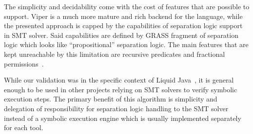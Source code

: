 \documentclass[sigplan,screen,review]{acmart}
\begin{document}
The simplicity and decidability come with the cost of features that are possible to support. Viper is a much more mature and rich backend for the language, while the presented approach is capped by the capabilities of separation logic support in SMT solver. Said capabilities are defined by GRASS fragment of separation logic which looks like ``propositional'' separation logic. The main features that are kept unreachable by this limitation are recursive predicates and fractional permissions~\cite{DBLP:conf/sas/Boyland03}. 

While our validation was in the specific context of Liquid Java~\cite{gamboa2021user}, it is general enough to be used in other projects relying on SMT solvers to verify symbolic execution steps. The primary benefit of this algorithm is simplicity and delegation of responsibility for separation logic handling to the SMT solver instead of a symbolic execution engine which is usually implemented separately for each tool. 




\end{document}
